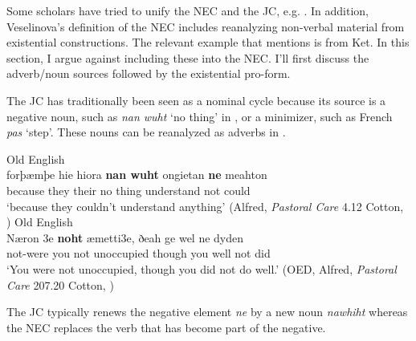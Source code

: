 \documentclass[output=paper,draft,draftmode,colorlinks,citecolor=brown]{langscibook}
\begin{document}
Some scholars have tried to unify the NEC and the JC,  
e.g. . In addition, Veselinova's definition of the NEC
includes reanalyzing non-verbal material from existential constructions.
The relevant example that \citet[136]{Veselinova2013} mentions is from
Ket. In this section, I argue against including these into the NEC. I'll
first discuss the adverb\slash noun sources followed by the existential
pro-form.

The JC has traditionally been seen as a nominal cycle because its source is
a negative noun, such as \textit{nan wuht} `no thing' in
, or a minimizer, such as French \textit{pas}
`step'. These nouns can be reanalyzed as adverbs in
. 
%
\begin{exe}\ex Old English \label{ex:other-OE-understand}\\
    \gll forþæmþe hie hiora \textbf{nan wuht} ongietan \textbf{ne} meahton
    \\ 
  because they their {no thing} understand not could \\
    \glt `because they couldn't understand anything'
(Alfred, \textit{Pastoral Care} 4.12 Cotton, \citealt[81]{Gelderen2004})
    \ex Old English \label{ex:other-OE-occupied}\\
    \gll Næron 3e \textbf{noht} æmetti3e, ðeah ge wel ne dyden \\
not-were you not unoccupied though you well not did \\
    \glt `You were not unoccupied, though you did not do well.' 
(OED, Alfred, \textit{Pastoral Care} 207.20 Cotton, \citealt[82]{Gelderen2004})
    \end{exe}
%
The JC typically renews the negative element \textit{ne} by a new noun \textit{nawhiht} whereas the NEC replaces the verb that has become part of the negative.
\end{document}

